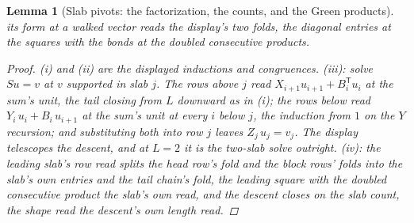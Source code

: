 \documentclass[11pt]{article}
\newtheorem{lemma}{Lemma}
\theoremstyle{definition}
\begin{document}
\begin{lemma}[Slab pivots: the factorization, the counts, and the Green
products]
its form at a walked vector reads the display's two folds, the
diagonal entries at the squares with the bonds at the doubled
consecutive products.
\begin{proof}
(i) and (ii) are the displayed inductions and congruences. (iii): solve
$Su=v$ at $v$ supported in slab $j$. The rows above $j$ read
$X_{i+1}u_{i+1}+B_i^{\mathsf T}u_i$ at the sum's unit, the tail closing from $L$
downward as in (i); the rows below read
$Y_i\,u_i+B_i\,u_{i+1}$ at the sum's unit at every $i$ below $j$,
the induction from $1$ on the $Y$
recursion; and
substituting both into row $j$ leaves $Z_j\,u_j=v_j$. The display
telescopes the descent, and at $L=2$ it is the two-slab solve outright.
(iv): the leading slab's row read splits the head row's fold and the
block rows' folds into the slab's own entries and the tail chain's
fold, the leading square with the doubled consecutive product the
slab's own read, and the descent closes on the slab count, the shape
read the descent's own length read.
\end{proof}
\end{lemma}
\end{document}
